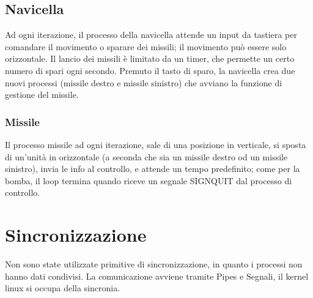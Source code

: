 \documentclass[a4paper,11pt]{report}
\begin{document}
\subsection{Navicella}
Ad ogni iterazione, il processo della navicella attende un input da tastiera per comandare il movimento
o sparare dei missili; il movimento può essere solo orizzontale. 
Il lancio dei missili è limitato da un timer, che permette un certo numero di spari ogni secondo.
Premuto il tasto di sparo, la navicella crea due nuovi processi (missile destro e missile sinistro)
che avviano la funzione di gestione del missile.

\subsubsection{Missile}
Il processo missile ad ogni iterazione, sale di una posizione in verticale, si sposta di un'unità in
orizzontale (a seconda che sia un missile destro od un missile sinistro), invia le info al controllo, e attende
un tempo predefinito; come per la bomba, il loop termina quando riceve un segnale SIGNQUIT dal processo di controllo.


\section{Sincronizzazione}
Non sono state utilizzate primitive di sincronizzazione, in quanto i processi non hanno dati
condivisi. La comunicazione avviene tramite Pipes e Segnali, il kernel linux si occupa della sincronia.
\end{document}
